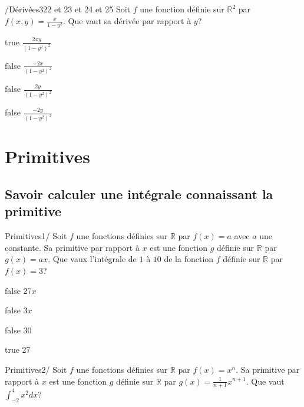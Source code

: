 \documentclass[11pt]{article}
\begin{document}
            \begin{question}{/}{Dérivées}{3}{22 et 23 et 24 et 25}
                Soit $f$ une fonction définie sur $\mathbb{R}^2$ par $f(x,y)=\frac{x}{1-y^2}$. Que vaut sa dérivée par rapport à $y$?
            \end{question}

            \begin{reponses}
                \item[true] $\frac{2xy}{(1-y^2)^2}$
                \item[false] $\frac{-2x}{(1-y^2)^2}$
                \item[false] $\frac{2y}{(1-y^2)^2}$
                \item[false] $\frac{-2y}{(1-y^2)^2}$
            \end{reponses}

    \section{Primitives}

        \subsection{Savoir calculer une intégrale connaissant la primitive}
        
        	\begin{question}{60}{Primitives}{1}{/}
				Soit $f$ une fonctions définies sur $\mathbb{R}$ par $f(x)=a$ avec $a$ une constante. Sa primitive par rapport à $x$ est une fonction $g$ définie sur $\mathbb{R}$ par $g(x)=ax$. Que vaux l'intégrale de $1$ à $10$ de la fonction $f$ définie sur $\mathbb{R}$ par $f(x)=3$?
            \end{question}

            \begin{reponses}
            	\item[false] $27x$
            	\item[false] $3x$
                \item[false] 30
                \item[true] 27
            \end{reponses}

            \begin{question}{60}{Primitives}{2}{/}
                Soit $f$ une fonctions définies sur $\mathbb{R}$ par $f(x)=x^n$. Sa primitive par rapport à $x$ est une fonction $g$ définie sur $\mathbb{R}$ par $g(x)=\frac{1}{n+1}x^{n+1}$. Que vaut $\int_{-2}^4 x^2 dx$?
            \end{question}
\end{document}
